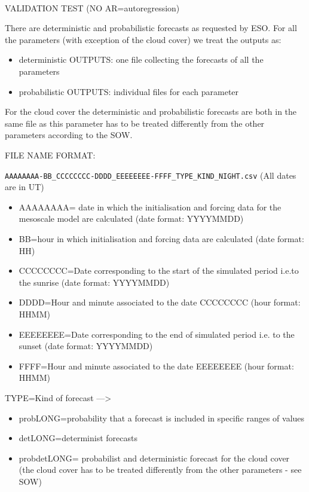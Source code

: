 
\begin{center}
\HRule \\[0.4cm]
VALIDATION TEST (NO AR=autoregression)
\HRule \\[0.4cm]
\end{center}

There are deterministic and probabilistic forecasts as requested by ESO. For all the parameters (with exception of the cloud cover) we treat the outputs as:
\begin{itemize}
\item         deterministic OUTPUTS: one file collecting the forecasts of all the parameters 
             
\item probabilistic OUTPUTS: individual files for each parameter 
\end{itemize}


For the cloud cover the deterministic and probabilistic forecasts are both in the same file as this parameter has to be treated differently from the other parameters according to the SOW.


FILE NAME FORMAT:

\verb+AAAAAAAA-BB_CCCCCCCC-DDDD_EEEEEEEE-FFFF_TYPE_KIND_NIGHT.csv+
(All dates are in UT)
\begin{itemize}
\item AAAAAAAA= date in which the initialisation and forcing data for the mesoscale model are calculated (date format: YYYYMMDD)
\item BB=hour in which initialisation and forcing data are calculated (date format: HH)
\item CCCCCCCC=Date corresponding to the start of the simulated period i.e.to the sunrise (date format: YYYYMMDD)
\item DDDD=Hour and minute associated to the date CCCCCCCC (hour format: HHMM)
\item EEEEEEEE=Date corresponding to the end of simulated period i.e. to the sunset (date format: YYYYMMDD)
\item FFFF=Hour and minute associated to the date EEEEEEEE (hour format: HHMM)
\end{itemize}


TYPE=Kind of forecast ---> 
\begin{itemize}
\item probLONG=probability that a forecast is included in specific ranges of values
\item detLONG=determinist forecasts
\item probdetLONG= probabilist and deterministic forecast for the cloud cover (the cloud cover has to be treated differently from the other parameters - see SOW)
\end{itemize}


